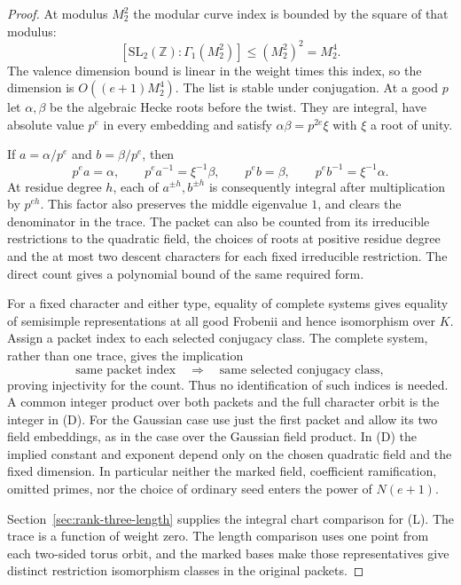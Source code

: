 \begin{proof}
At modulus \(M_2^2\) the modular curve index is bounded by the square of that modulus:
\[
 [\mathrm{SL}_2(\mathbb Z):\Gamma_1(M_2^2)]\le (M_2^2)^2=M_2^4 .
\]
The valence dimension bound is linear in the weight times
this index, so the dimension is \(O((e+1)M_2^4)\). The
list is stable under conjugation. At a good \(p\) let
\(\alpha,\beta\) be the algebraic Hecke roots before the
twist. They are integral, have absolute value \(p^e\)
in every embedding and satisfy \(\alpha\beta=p^{2e}\xi\)
with \(\xi\) a root of unity.

If \(a=\alpha/p^e\) and
\(b=\beta/p^e\), then
\[
             p^e a=\alpha,\qquad p^e a^{-1}=\xi^{-1}\beta,
 \qquad      p^e b=\beta,\qquad p^e b^{-1}=\xi^{-1}\alpha .
\]
At residue degree \(h\), each of \(a^{\pm h},b^{\pm h}\)
is consequently integral after multiplication by \(p^{eh}\).
This factor also preserves the middle eigenvalue \(1\), and
clears the denominator in the trace.
The packet can also be counted from its irreducible restrictions to the quadratic field, the choices of roots at positive residue degree and the at most two descent characters for each fixed irreducible restriction.
The direct count gives a polynomial bound of the same
required form. \hfill\mbox{\cite{deligne-galois,carayol-local,deligne-weil}}

For a fixed character and either type, equality of complete
systems gives equality of semisimple representations at
all good Frobenii and hence isomorphism over \(K\).
Assign a packet index to each selected conjugacy class. The complete system, rather than one trace, gives the implication
\[
 \text{same packet index}\quad\Longrightarrow\quad\text{same selected conjugacy class},
\]
proving injectivity for the count. Thus no
identification of such indices is needed. A common integer product over
both packets and the full character orbit is the integer
in (D). For the Gaussian case use just the first packet
and allow its two field embeddings, as in the case over the Gaussian field
product. In (D) the implied constant and exponent depend
only on the chosen quadratic field and the fixed dimension.
In particular neither the marked field, coefficient
ramification, omitted primes, nor the choice of ordinary
seed enters the power of \(N(e+1)\).

Section~\ref{sec:rank-three-length} supplies the integral
chart comparison for (L). The trace is a function of
weight zero. The length comparison uses one point
from each two-sided torus orbit, and the marked
bases make those representatives give distinct
restriction isomorphism classes in the original packets.
\end{proof}
